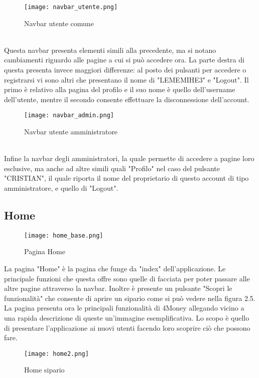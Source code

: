 \documentclass[binding=0.6cm, oneside, noexaminfo, italian]{sapthesis}
\begin{document}
\begin{figure}[h]
    \centering
    \texttt{[image: navbar\_utente.png]}
    \caption{Navbar utente comune}
    \label{fig:navbar_utente}
\end{figure} \\
Questa navbar presenta elementi simili alla precedente, ma si notano cambiamenti riguardo alle pagine a cui si può accedere ora. La parte destra di questa presenta invece maggiori differenze: al posto dei pulsanti per accedere o registrarsi vi sono altri che presentano il nome di "LEMEMIHE3" e "Logout". Il primo è relativo alla pagina del profilo e il suo nome è quello dell'username dell'utente, mentre il secondo consente effettuare la disconnessione dell'account. \\
\begin{figure}[h]
    \centering
    \texttt{[image: navbar\_admin.png]}
    \caption{Navbar utente amministratore}
    \label{fig:navbar_admin}
\end{figure} \\
Infine la navbar degli amministratori, la quale permette di accedere a pagine loro esclusive, ma anche ad altre simili quali "Profilo" nel caso del pulsante "CRISTIAN", il quale riporta il nome del proprietario di questo account di tipo amministratore, e quello di "Logout".
\newpage
\subsection{Home}
\begin{figure}[h]
    \centering
    \texttt{[image: home\_base.png]}
    \caption{Pagina Home}
    \label{fig:home}
\end{figure}
La pagina "Home" è la pagina che funge da "index" dell'applicazione. Le principale funzioni che questa offre sono quelle di facciata per poter passare alle altre pagine attraverso la navbar. Inoltre è presente un pulsante "Scopri le funzionalità" che consente di aprire un sipario come si può vedere nella figura 2.5. La pagina presenta ora le principali funzionalità di 4Money allegando vicino a una rapida descrizione di queste un'immagine esemplificativa. Lo scopo è quello di presentare l'applicazione ai nuovi utenti facendo loro scoprire ciò che possono fare.
\begin{figure}[!ht]
    \centering
    \texttt{[image: home2.png]}
    \caption{Home sipario}
    \label{fig:home_sipario}
\end{figure}
\newpage
\end{document}
